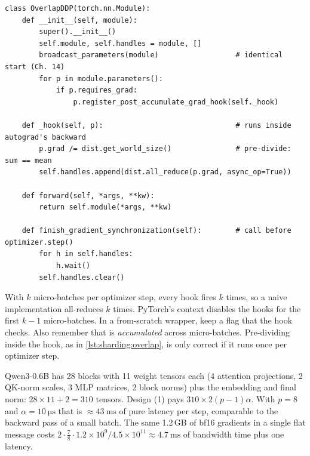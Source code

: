 \begin{lstlisting}[caption={Design (3): overlapping per-parameter all-reduces with post-accumulate hooks.},label={lst:sharding:overlap}]
class OverlapDDP(torch.nn.Module):
    def __init__(self, module):
        super().__init__()
        self.module, self.handles = module, []
        broadcast_parameters(module)                  # identical start (Ch. 14)
        for p in module.parameters():
            if p.requires_grad:
                p.register_post_accumulate_grad_hook(self._hook)

    def _hook(self, p):                               # runs inside autograd's backward
        p.grad /= dist.get_world_size()               # pre-divide: sum == mean
        self.handles.append(dist.all_reduce(p.grad, async_op=True))

    def forward(self, *args, **kw):
        return self.module(*args, **kw)

    def finish_gradient_synchronization(self):        # call before optimizer.step()
        for h in self.handles:
            h.wait()
        self.handles.clear()
\end{lstlisting}

\begin{pitfall}
With $k$ micro-batches per optimizer step, every hook fires $k$ times, so a naive implementation
all-reduces $k$ times. PyTorch's  context disables the hooks for the first $k-1$
micro-batches. In a from-scratch wrapper, keep a flag that the hook checks. Also remember that
 is \emph{accumulated} across micro-batches. Pre-dividing inside the hook, as in
\cref{lst:sharding:overlap}, is only correct if it runs once per optimizer step.
\end{pitfall}

\begin{napkinmath}
Qwen3-0.6B has 28 blocks with 11 weight tensors each (4 attention projections, 2 QK-norm scales,
3 MLP matrices, 2 block norms) plus the embedding and final norm: $28\times11+2=310$ tensors.
Design (1) pays $310\times2(p-1)\alpha$. With $p=8$ and $\alpha=\SI{10}{\micro\second}$ that is
$\approx\SI{43}{\milli\second}$ of pure latency per step, comparable to the backward pass of a
small batch. The same 1.2\,GB of bf16 gradients in a single flat message costs
$2\cdot\frac{7}{8}\cdot 1.2\times10^{9}/4.5\times10^{11}\approx\SI{4.7}{\milli\second}$ of
bandwidth time plus one latency.
\end{napkinmath}

